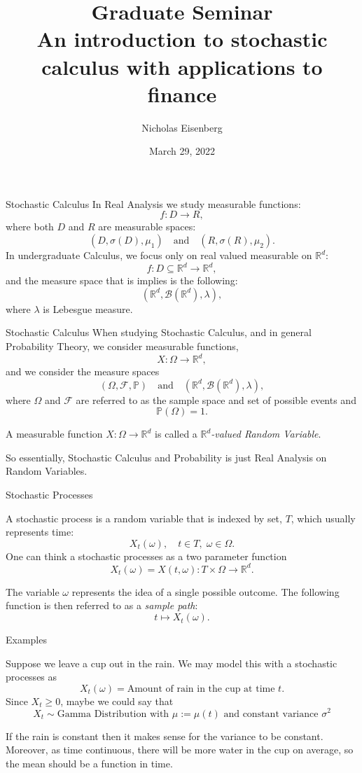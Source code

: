 \documentclass{beamer}%
\title[About Beamer] %
{Graduate Seminar \\
An introduction to stochastic calculus with applications to finance}
\author[Arthur, Doe] %
{Nicholas Eisenberg}
\date[VLC 2021] %
{ \small March 29, 2022 
}
\numberwithin{equation}{section}
\newcommand{\R}{\mathbb{R}}
\begin{document}
	\frame{\titlepage}	
	\setcounter{page}{1}
	\begin{frame}{Stochastic Calculus}
In Real Analysis we study measurable functions:
	\[
		f : D \to R,
	\]
where both $D$ and $R$ are measurable spaces:
	\[
		(D, \sigma(D), \mu_1) \quad \text{and} \quad (R, \sigma(R), \mu_2).
	\]
In undergraduate Calculus, we focus only on real valued measurable on $\R^d$:
	\[
		f : D \subseteq \R^d \to \R^d,
	\]
and the measure space that is implies is the following:
	\[
		(\R^d, \mathscr{B}(\R^d), \lambda),
	\]
where $\lambda$ is Lebesgue measure.
	\end{frame}

	\begin{frame}{Stochastic Calculus}
When studying Stochastic Calculus, and in general  Probability Theory, we consider measurable functions,
	\[
		X : \Omega \to \R^d,
	\]
and we consider the measure spaces 
	\[
		(\Omega, \mathcal{F}, \mathbb{P}) \quad \text{and} \quad (\R^d, \mathscr{B}(\R^d), \lambda),
	\]
where $\Omega$ and $\mathcal{F}$ are referred to as the sample space and set of possible events and
	\[
		\mathbb{P}(\Omega) = 1.
	\]
\begin{definition}
	A measurable function $X: \Omega \to \R^d$ is called a {\it $\R^d$-valued Random Variable}.
\end{definition}

So essentially, Stochastic Calculus and Probability is just Real Analysis on Random Variables. 
	\end{frame}

\begin{frame}{Stochastic Processes}
	\begin{definition}
A stochastic process is a random variable that is indexed by set, $T$, which usually represents time:
	\[
		X_t(\omega), \quad t \in T, \; \omega \in \Omega.
	\]
One can think a stochastic processes as a two parameter function
	\[
		X_t(\omega) = X(t,\omega): T \times \Omega \to \R^d.
	\]
	\end{definition}
	\begin{definition}
The variable $\omega$ represents the idea of a single possible outcome. The following function is then referred to as a {\it sample path}:
	\[
		t \mapsto X_t(\omega).
	\]
	\end{definition}

\end{frame}

\begin{frame}{Examples}
	\begin{example}
Suppose we leave a cup out in the rain. We may model this with a stochastic processes as 
	\[
		X_t(\omega) = \text{Amount of rain in the cup at time $t$}.
	\]
Since $X_t \ge 0$, maybe we could say that 
	\[
		X_t \sim \text{Gamma Distribution with } \mu := \mu(t) \text{ and constant variance } \sigma^2
	\]
	\end{example}
If the rain is constant then it makes sense for the variance to be constant. Moreover, as time continuous, there will be more water in the cup on average, so the mean should be a function in time.
\end{frame}
\end{document}
